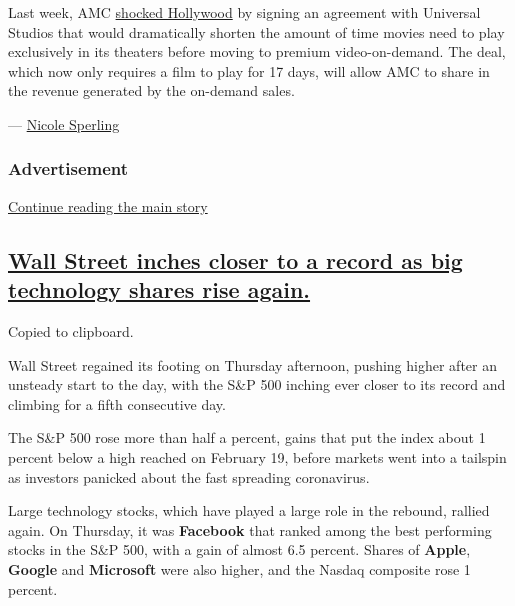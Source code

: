 Last week, AMC
\href{https://www.nytimes3xbfgragh.onion/2020/07/28/business/media/universal-amc-movies-at-home.html}{shocked
Hollywood} by signing an agreement with Universal Studios that would
dramatically shorten the amount of time movies need to play exclusively
in its theaters before moving to premium video-on-demand. The deal,
which now only requires a film to play for 17 days, will allow AMC to
share in the revenue generated by the on-demand sales.

--- \href{https://www.nytimes3xbfgragh.onion/by/nicole-sperling}{Nicole
Sperling}

\hypertarget{advertisement-1}{%
\subsubsection{Advertisement}\label{advertisement-1}}

\protect\hyperlink{after-dfp-ad-mid2}{Continue reading the main story}

\hypertarget{wall-street-inches-closer-to-a-record-as-big-technology-shares-rise-again}{%
\subsection{\texorpdfstring{\protect\hyperlink{wall-street-inches-closer-to-a-record-as-big-technology-shares-rise-again}{Wall
Street inches closer to a record as big technology shares rise
again.}}{Wall Street inches closer to a record as big technology shares rise again.}}\label{wall-street-inches-closer-to-a-record-as-big-technology-shares-rise-again}}

Copied to clipboard.

Wall Street regained its footing on Thursday afternoon, pushing higher
after an unsteady start to the day, with the S\&P 500 inching ever
closer to its record and climbing for a fifth consecutive day.

The S\&P 500 rose more than half a percent, gains that put the index
about 1 percent below a high reached on February 19, before markets went
into a tailspin as investors panicked about the fast spreading
coronavirus.

Large technology stocks, which have played a large role in the rebound,
rallied again. On Thursday, it was \textbf{Facebook} that ranked among
the best performing stocks in the S\&P 500, with a gain of almost 6.5
percent. Shares of \textbf{Apple}, \textbf{Google} and
\textbf{Microsoft} were also higher, and the Nasdaq composite rose 1
percent.

